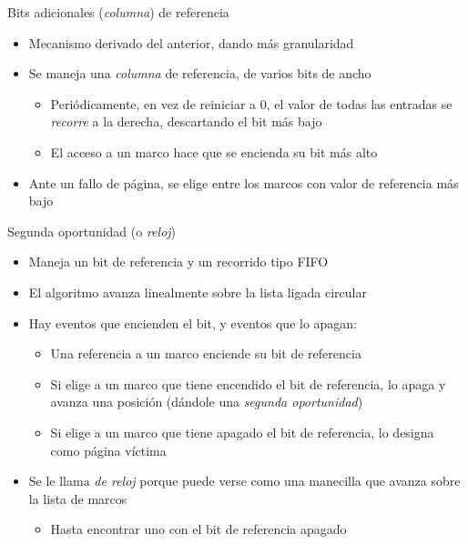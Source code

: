 \documentclass[presentation]{beamer}
\begin{document}
\begin{frame}[label={sec:org314f289}]{Bits adicionales (\emph{columna}) de referencia}
\begin{itemize}
\item Mecanismo derivado del anterior, dando más granularidad
\item Se maneja una \emph{columna} de referencia, de varios bits de ancho
\begin{itemize}
\item Periódicamente, en vez de reiniciar a 0, el valor de todas las
entradas se \emph{recorre} a la derecha, descartando el bit más bajo
\item El acceso a un marco hace que se encienda su bit más alto
\end{itemize}
\item Ante un fallo de página, se elige entre los marcos con valor de
referencia más bajo
\end{itemize}
\end{frame}

\begin{frame}[label={sec:org4938150}]{Segunda oportunidad (o \emph{reloj})}
\begin{itemize}
\item Maneja un bit de referencia y un recorrido tipo FIFO
\item El algoritmo avanza linealmente sobre la lista ligada circular
\item Hay eventos que encienden el bit, y eventos que lo apagan:
\begin{itemize}
\item Una referencia a un marco enciende su bit de referencia
\item Si elige a un marco que tiene encendido el bit de referencia, lo
apaga y avanza una posición (dándole una \emph{segunda oportunidad})
\item Si elige a un marco que tiene apagado el bit de referencia, lo
designa como página víctima
\end{itemize}
\item Se le llama \emph{de reloj} porque puede verse como una manecilla que
avanza sobre la lista de marcos
\begin{itemize}
\item Hasta encontrar uno con el bit de referencia apagado
\end{itemize}
\end{itemize}
\end{frame}
\end{document}
